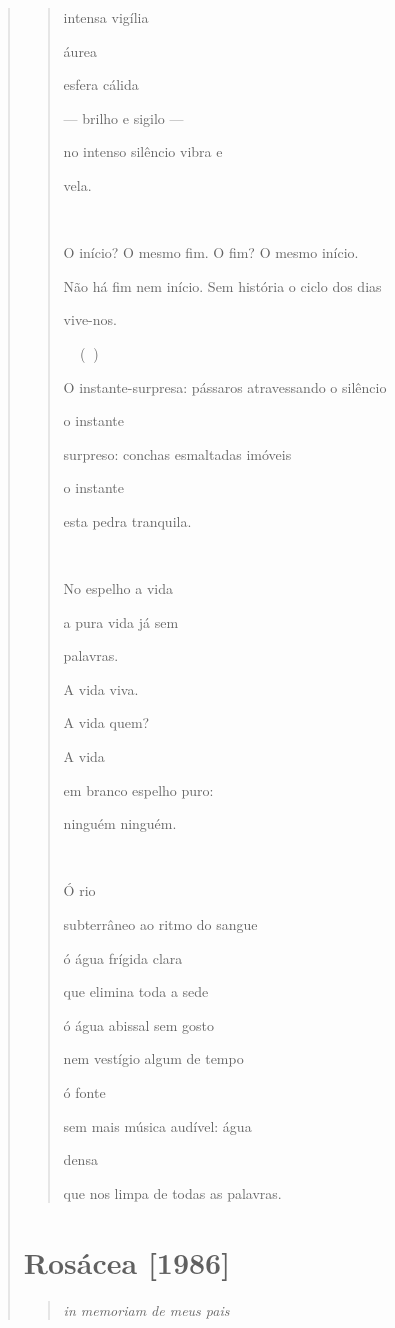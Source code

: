 \begin{verse}
\begin{quote}
intensa vigília

áurea

esfera cálida

--- brilho e sigilo ---

no intenso silêncio vibra e

vela.



O início? O mesmo fim. O fim? O mesmo início.

Não há fim nem início. Sem história o ciclo dos dias

vive-nos.

 ()

O instante-surpresa: pássaros atravessando o silêncio

o instante

surpreso: conchas esmaltadas imóveis

o instante

esta pedra tranquila.



No espelho a vida

a pura vida já sem

palavras.

A vida viva.

A vida quem?

A vida

em branco espelho puro:

ninguém ninguém.



Ó rio

subterrâneo ao ritmo do sangue

ó água frígida clara

que elimina toda a sede

ó água abissal sem gosto

nem vestígio algum de tempo

ó fonte

sem mais música audível: água

densa

que nos limpa de todas as palavras.
\end{quote}

\section{Rosácea {[}1986{]}}\label{rosuxe1cea}

\begin{quote}
\emph{in memoriam de meus pais}


\end{quote}
\end{verse}
